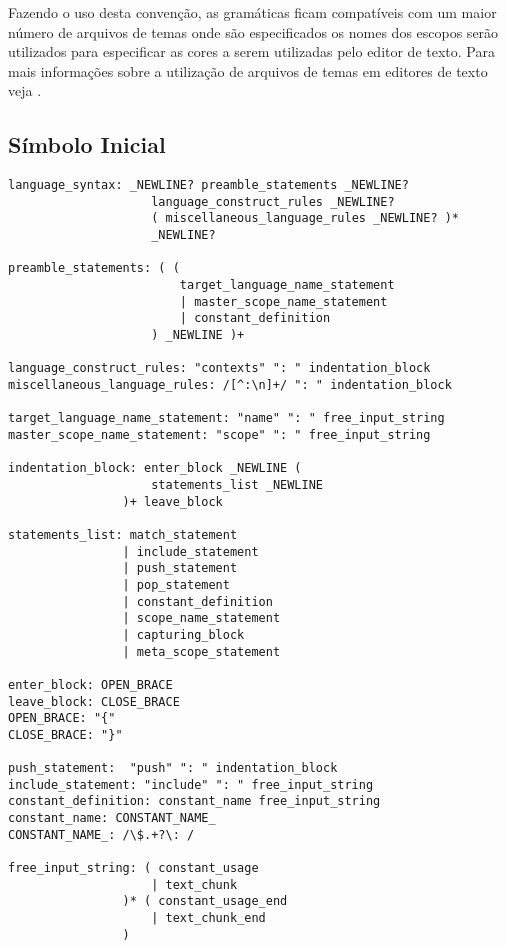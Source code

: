 Fazendo o uso desta convenção,
as gramáticas ficam compatíveis com um maior número de arquivos de temas onde são especificados os nomes dos escopos serão utilizados para especificar as cores a serem utilizadas pelo editor de texto.
Para mais informações sobre a utilização de arquivos de temas em editores de texto veja .


\subsection{Símbolo Inicial}




\begin{lstlisting}
language_syntax: _NEWLINE? preamble_statements _NEWLINE?
                    language_construct_rules _NEWLINE?
                    ( miscellaneous_language_rules _NEWLINE? )*
                    _NEWLINE?

preamble_statements: ( (
                        target_language_name_statement
                        | master_scope_name_statement
                        | constant_definition
                    ) _NEWLINE )+

language_construct_rules: "contexts" ": " indentation_block
miscellaneous_language_rules: /[^:\n]+/ ": " indentation_block

target_language_name_statement: "name" ": " free_input_string
master_scope_name_statement: "scope" ": " free_input_string

indentation_block: enter_block _NEWLINE (
                    statements_list _NEWLINE
                )+ leave_block

statements_list: match_statement
                | include_statement
                | push_statement
                | pop_statement
                | constant_definition
                | scope_name_statement
                | capturing_block
                | meta_scope_statement

enter_block: OPEN_BRACE
leave_block: CLOSE_BRACE
OPEN_BRACE: "{"
CLOSE_BRACE: "}"

push_statement:  "push" ": " indentation_block
include_statement: "include" ": " free_input_string
constant_definition: constant_name free_input_string
constant_name: CONSTANT_NAME_
CONSTANT_NAME_: /\$.+?\: /

free_input_string: ( constant_usage
                    | text_chunk
                )* ( constant_usage_end
                    | text_chunk_end
                )


\end{lstlisting}
